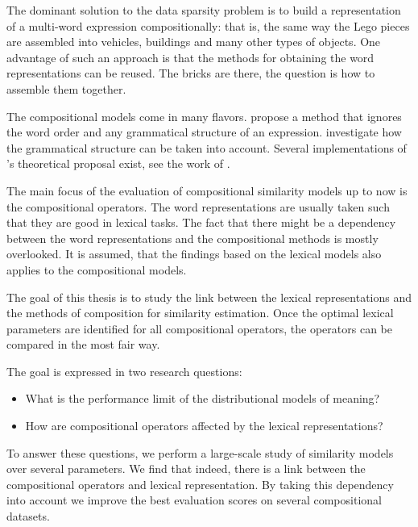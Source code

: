 The dominant solution to the data sparsity problem is to build a representation of a multi-word expression compositionally: that is, the same way the Lego pieces are assembled into vehicles, buildings and many other types of objects. One advantage of such an approach is that the methods for obtaining the word representations can be reused. The bricks are there, the question is how to assemble them together.

The compositional models come in many flavors. \citet{mitchell2010composition} propose a method that ignores the word order and any grammatical structure of an expression. \citet{DBLP:journals/corr/abs-1003-4394,baroni2014frege} investigate how the grammatical structure can be taken into account. Several implementations of \citet{DBLP:journals/corr/abs-1003-4394}'s theoretical proposal exist, see the work of \citet{Grefenstette:2011:ESC:2145432.2145580,Grefenstette:2011:ETV:2140490.2140497,kartsadrqpl2014,fried-polajnar-clark:2015:ACL-IJCNLP}.

The main focus of the evaluation of compositional similarity models up to now is the compositional operators. The word representations are usually taken such that they are good in lexical tasks. The fact that there might be a dependency between the word representations and the compositional methods is mostly overlooked. It is assumed, that the findings based on the lexical models also applies to the compositional models.

The goal of this thesis is to study the link between the lexical representations and the methods of composition for similarity estimation. Once the optimal lexical parameters are identified for all compositional operators, the operators can be compared in the most fair way.

The goal is expressed in two research questions:
\begin{itemize}
\item What is the performance limit of the distributional models of meaning?
\item How are compositional operators affected by the lexical representations?
\end{itemize}

To answer these questions, we perform a large-scale study of similarity models over several parameters. We find that indeed, there is a link between the compositional operators and lexical representation. By taking this dependency into account we improve the best evaluation scores on several compositional datasets.

